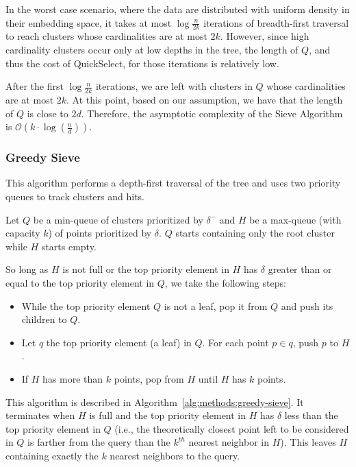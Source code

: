 In the worst case scenario, where the data are distributed with uniform density in their embedding space, it takes at most $\log{\frac{n}{2k}}$ iterations of breadth-first traversal to reach clusters whose cardinalities are at most $2k$.
However, since high cardinality clusters occur only at low depths in the tree, the length of $Q$, and thus the cost of QuickSelect, for those iterations is relatively low.

After the first $\log{\frac{n}{2k}}$ iterations, we are left with clusters in $Q$ whose cardinalities are at most $2k$.
At this point, based on our assumption, we have that the length of $Q$ is close to $2d$.
Therefore, the asymptotic complexity of the Sieve Algorithm is $\mathcal{O} \left( k \cdot \log(\frac{n}{d}) \right)$.


\subsubsection{Greedy Sieve}
\label{subsubsec:methods:knn:greedy-sieve}

This algorithm performs a depth-first traversal of the tree and uses two priority queues to track clusters and hits.

Let $Q$ be a min-queue of clusters prioritized by $\delta^{-}$ and $H$ be a max-queue (with capacity $k$) of points prioritized by $\delta$.
$Q$ starts containing only the root cluster while $H$ starts empty.

So long as $H$ is not full or the top priority element in $H$ has $\delta$ greater than or equal to the top priority element in $Q$, we take the following steps:

\begin{itemize}
    \item While the top priority element $Q$ is not a leaf, pop it from $Q$ and push its children to $Q$.
    \item Let $q$ the top priority element (a leaf) in $Q$. For each point $p \in q$, push $p$ to $H$.
    \item If $H$ has more than $k$ points, pop from $H$ until $H$ has $k$ points.
\end{itemize}

This algorithm is described in Algorithm~\ref{alg:methods:greedy-sieve}.
It terminates when $H$ is full and the top priority element in $H$ has $\delta$ less than the top priority element in $Q$ (i.e., the theoretically closest point left to be considered in $Q$ is farther from the query than the $k^{th}$ nearest neighbor in $H$).
This leaves $H$ containing exactly the $k$ nearest neighbors to the query.


